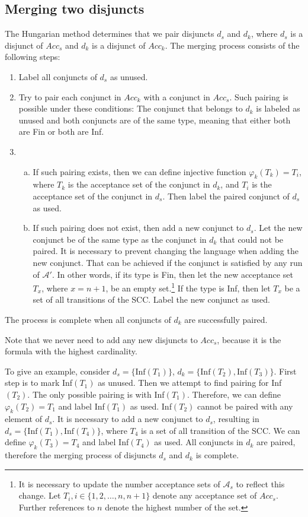 \documentclass[
  digital, %
  twoside, %
  table,   %
  lof,     %
  lot,     %
]{fithesis3}
\begin{document}
\subsection{Merging two disjuncts}
The Hungarian method determines that we pair disjuncts $d_s$ and $d_k$, where $d_s$ is a disjunct of $Acc_s$ and $d_k$ is a disjunct of $Acc_k$. The merging process consists of the following steps:
\begin{enumerate}
  \item Label all conjuncts of $d_s$ as unused.
  \item Try to pair each conjunct in $Acc_k$ with a conjunct in $Acc_s$. Such pairing is possible under these conditions: The conjunct that belongs to $d_k$ is labeled as unused and both conjuncts are of the same type, meaning that either both are Fin or both are Inf.
  \item \begin{enumerate}[a)]
    \item If such pairing exists, then we can define injective function $\varphi_k (T_k) = T_i$, where $T_k$ is the acceptance set of the conjunct in $d_k$, and $T_i$ is the acceptance set of the conjunct in $d_s$. Then label the paired conjunct of $d_s$ as used.
    \item If such pairing does not exist, then add a new conjunct to $d_s$. Let the new conjunct be of the same type as the conjunct in $d_k$ that could not be paired. It is necessary to prevent changing the language when adding the new conjunct. That can be achieved if the conjunct is satisfied by any run of $\mathcal{A'}$. In other words, if its type is Fin, then let the new acceptance set $T_x$, where $x = n + 1$, be an empty set.\footnote{It is necessary to update the number acceptance sets of $\mathcal{A}_s$ to reflect this change. Let $T_i, i \in \{1,2, \dots, n, n+1\}$ denote any acceptance set of $Acc_s$. Further references to $n$ denote the highest number of the set.} If the type is Inf, then let $T_x$ be a set of all transitions of the SCC. Label the new conjunct as used.
  \end{enumerate}
\end{enumerate}
The process is complete when all conjuncts of $d_k$ are successfully paired.

Note that we never need to add any new disjuncts to  $Acc_s$, because it is the formula with the highest cardinality.

To give an example, consider $d_s = \{\text{Inf}(T_1)\}$, $d_k = \{\text{Inf}(T_2), \text{Inf}(T_3)\}$. First step is to mark Inf$(T_1)$ as unused. Then we attempt to find pairing for Inf$(T_2)$. The only possible pairing is with Inf$(T_1)$. Therefore, we can define $\varphi_k(T_2) = T_1$ and label Inf$(T_1)$ as used. Inf$(T_2)$ cannot be paired with any element of $d_s$. It is necessary to add a new conjunct to $d_s$, resulting in $d_s = \{\text{Inf}(T_1), \text{Inf}(T_4)\}$, where $T_4$ is a set of all transition of the SCC. We can define $\varphi_k(T_3) = T_4$ and label Inf$(T_4)$ as used. All conjuncts in $d_k$ are paired, therefore the merging process of disjuncts $d_s$ and $d_k$ is complete.
\end{document}
